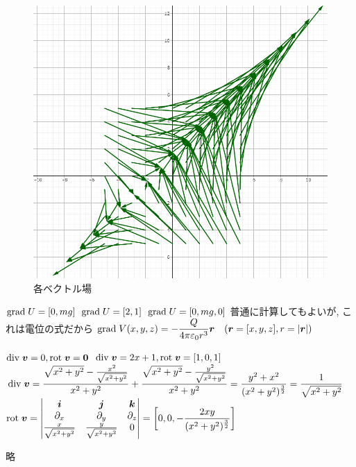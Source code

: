 \documentclass[a4j,dvipdfmx]{jsarticle}
\renewcommand{\div}{{\rm div}\hspace{1mm}}
\newcommand{\grad}{{\rm grad}\hspace{1mm}}
\newcommand{\rot}{{\rm rot}\hspace{1mm}}
\begin{document}
\begin{qparts}
\begin{figure}[h]
\begin{minipage}[t]{.3\textwidth}
                \end{minipage}
                \begin{minipage}[t]{.3\textwidth}
                    \centering
                    \includegraphics[scale=0.25]{img/vector_field3.png}
                \end{minipage}
                \caption{各ベクトル場}
            \end{figure}
            \qpart 
            \begin{qlist}
                \qitem $\grad U = [0,mg]$
                \qitem $\grad U = [2,1]$
                \qitem $\grad U = [0,mg,0]$
                \qitem 普通に計算してもよいが, これは電位の式だから
                $\displaystyle \grad V(x,y,z)=-\frac{Q}{4\pi\varepsilon_0r^3}\bm{r}\quad (\bm{r}=[x,y,z],r=|\bm{r}|)$
            \end{qlist}
            \qpart 
            \begin{qlist}
                \qitem $\div\bm{v}=0,\rot\bm{v}=\bm{0}$
                \qitem $\div\bm{v}=2x+1,\rot\bm{v}=[1,0,1]$
                \qitem $\displaystyle \div\bm{v}=\frac{\sqrt{x^2+y^2}-\frac{x^2}{\sqrt{x^2+y^2}}}{x^2+y^2}+\frac{\sqrt{x^2+y^2}-\frac{y^2}{\sqrt{x^2+y^2}}}{x^2+y^2}=\frac{y^2+x^2}{(x^2+y^2)^{\frac{3}{2}}}=\frac{1}{\sqrt{x^2+y^2}}$\\
                $\displaystyle
                    \rot \bm{v}=\begin{vmatrix}
                        \bm{i} & \bm{j} & \bm{k} \\
                        \partial_x & \partial_y & \partial_z \\
                        \frac{x}{\sqrt{x^2+y^2}} & \frac{y}{\sqrt{x^2+y^2}} & 0
                    \end{vmatrix}=\left[0,0,-\frac{2xy}{(x^2+y^2)^{\frac{3}{2}}}\right]
                $
            \end{qlist}
            \qpart 略
        \end{qparts}
\end{document}
